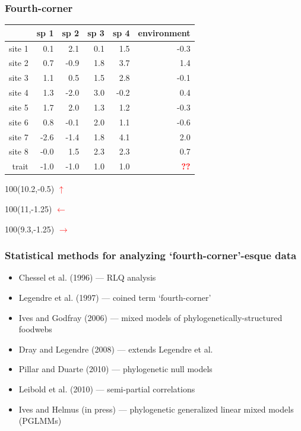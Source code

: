 \documentclass{beamer}
\numberwithin{exercise}{section}
\begin{document}
\begin{frame}
\frametitle{Fourth-corner}
\small
\begin{table}[ht]
\begin{center}
\begin{tabular}{r|rrrr|r|}
  & sp 1 & sp 2 & sp 3 & sp 4 & environment \\ 
  \hline
site 1 & 0.1 & 2.1 & 0.1 & 1.5 & -0.3 \\ 
  site 2 & 0.7 & -0.9 & 1.8 & 3.7 & 1.4 \\ 
  site 3 & 1.1 & 0.5 & 1.5 & 2.8 & -0.1 \\ 
  site 4 & 1.3 & -2.0 & 3.0 & -0.2 & 0.4 \\ 
  site 5 & 1.7 & 2.0 & 1.3 & 1.2 & -0.3 \\ 
  site 6 & 0.8 & -0.1 & 2.0 & 1.1 & -0.6 \\ 
  site 7 & -2.6 & -1.4 & 1.8 & 4.1 & 2.0 \\ 
  site 8 & -0.0 & 1.5 & 2.3 & 2.3 & 0.7 \\ 
   \hline
  trait & -1.0 & -1.0 & 1.0 & 1.0 & \textcolor{red}{\textbf{??}} \\ 
   \hline
\end{tabular}
\end{center}
\end{table}\normalsize 
\begin{textblock}{100}(10.2,-0.5)
\textcolor{red}{$\mathbf{\uparrow}$}
\end{textblock}
\begin{textblock}{100}(11,-1.25)
\textcolor{red}{$\mathbf{\leftarrow}$}
\end{textblock}
\begin{textblock}{100}(9.3,-1.25)
\textcolor{red}{$\mathbf{\rightarrow}$}
\end{textblock}
\end{frame}

\begin{frame}
\frametitle{Statistical methods for analyzing `fourth-corner'-esque data}
\begin{center}
\begin{itemize}
\item Chessel et al. (1996) --- RLQ analysis
\item Legendre et al. (1997) --- coined term `fourth-corner'
\item Ives and Godfray (2006) --- mixed models of phylogenetically-structured foodwebs
\item Dray and Legendre (2008) --- extends Legendre et al.
\item Pillar and Duarte (2010) --- phylogenetic null models
\item Leibold et al. (2010) --- semi-partial correlations
\item Ives and Helmus (in press) --- phylogenetic generalized linear mixed models (PGLMMs)
\end{itemize}
\end{center}
\end{frame}
\end{document}
